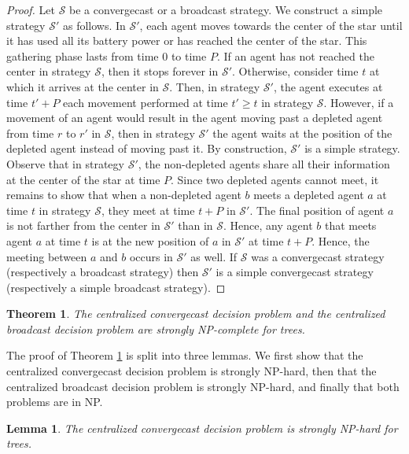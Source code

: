 \documentclass{article}
\newtheorem{lemma}{Lemma}
\newtheorem{theorem}{Theorem}
\newcommand{\cA}{\ensuremath{\mathcal{S}\xspace}}
\newcommand\strat{\mbox{strategy}\xspace}
\newcommand\cccast{centralized convergecast\xspace}
\begin{document}
\begin{proof}
Let $\cA$ be a convergecast or a broadcast {\strat}. We construct a simple {\strat} $\cA'$ as follows. In $\cA'$, each agent 
moves towards the center of the star until it has used all its battery power or has reached the center of the star. This gathering phase lasts from time $0$ to time $P$. If an agent has not reached the center in strategy $\cA$, then it stops forever in $\cA'$.
Otherwise, consider time $t$ at which it arrives at the center in $\cA$. Then, in strategy $\cA'$, the agent executes at time $t'+P$ each movement performed at time $t'\geq t$ in {\strat} $\cA$. However, if a movement of an agent would result in the agent moving past a depleted agent from time $r$ to $r'$ in $\cA$, then in strategy $\cA'$ the agent waits at the position of the depleted agent instead of moving past it.  By construction, $\cA'$ is a simple {\strat}. Observe that in {\strat} $\cA'$, the non-depleted agents share all their information at the center of the star at time $P$. 
Since two depleted agents cannot meet, it remains to show that when a non-depleted agent $b$ meets a depleted agent $a$ at time $t$ in {\strat} $\cA$, they meet at time $t+P$ in $\cA'$. The final position of agent $a$ is not farther from the center in $\cA'$ than in $\cA$. Hence, any agent $b$ that meets agent $a$ at time $t$ is at the new position of $a$ in $\cA'$ at time $t+P$. Hence, the meeting between $a$ and $b$ occurs in $\cA'$ as well. If $\cA$ was a convergecast strategy (respectively a broadcast strategy) then $\cA'$ is a simple convergecast strategy (respectively a simple broadcast strategy).
\end{proof}

\begin{theorem}\label{th:NP-graph}
The {\cccast} decision problem and the centralized broadcast decision problem are strongly NP-complete for trees.  
\end{theorem}

The proof of Theorem \ref{th:NP-graph} is split into three lemmas. We first show that the {\cccast} decision problem is strongly NP-hard, then that the centralized broadcast decision problem is strongly NP-hard, and finally that both problems are in NP.

\begin{lemma}\label{th:NP-hard-graph}
The {\cccast} decision problem is strongly NP-hard for trees.  
\end{lemma}
\end{document}
